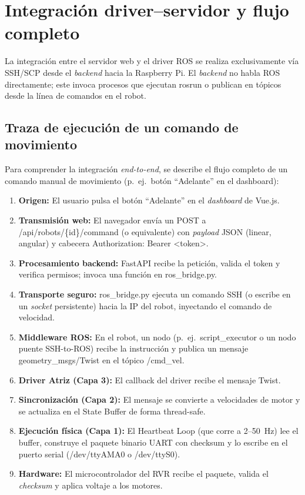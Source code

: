\documentclass[12pt]{article}
\numberwithin{figure}{section}
\numberwithin{table}{section}
\def\code#1{#1}%
\def\file#1{#1}%
\newcommand{\code}[1]{\textcolor{codeblue}{\url{#1}}}
\newcommand{\file}[1]{\textcolor{darkblue}{\url{#1}}}
\begin{document}
\section{Integración driver--servidor y flujo completo}
\justifying

La integración entre el servidor web y el driver ROS se realiza exclusivamente vía SSH/SCP desde el \textit{backend} hacia la Raspberry Pi. El \textit{backend} no habla ROS directamente; este invoca procesos que ejecutan \code{rosrun} o publican en tópicos desde la línea de comandos en el robot.


\subsection{Traza de ejecución de un comando de movimiento}

Para comprender la integración \textit{end-to-end}, se describe el flujo completo de un comando manual de movimiento (p.\ ej.\ botón ``Adelante'' en el dashboard):

\begin{enumerate}
    \item \textbf{Origen:} El usuario pulsa el botón ``Adelante'' en el \textit{dashboard} de Vue.js.
    \item \textbf{Transmisión web:} El navegador envía un \code{POST} a \code{/api/robots/\{id\}/command} (o equivalente) con \textit{payload} JSON (\code{linear}, \code{angular}) y cabecera \code{Authorization: Bearer <token>}.
    \item \textbf{Procesamiento backend:} FastAPI recibe la petición, valida el token y verifica permisos; invoca una función en \file{ros\_bridge.py}.
    \item \textbf{Transporte seguro:} \file{ros\_bridge.py} ejecuta un comando SSH (o escribe en un \textit{socket} persistente) hacia la IP del robot, inyectando el comando de velocidad.
    \item \textbf{Middleware ROS:} En el robot, un nodo (p.\ ej.\ \code{script\_executor} o un nodo puente SSH-to-ROS) recibe la instrucción y publica un mensaje \code{geometry\_msgs/Twist} en el tópico \code{/cmd\_vel}.
    \item \textbf{Driver Atriz (Capa 3):} El callback del driver recibe el mensaje Twist.
    \item \textbf{Sincronización (Capa 2):} El mensaje se convierte a velocidades de motor y se actualiza en el State Buffer de forma thread-safe.
    \item \textbf{Ejecución física (Capa 1):} El Heartbeat Loop (que corre a 2--50~Hz) lee el buffer, construye el paquete binario UART con checksum y lo escribe en el puerto serial (\code{/dev/ttyAMA0} o \code{/dev/ttyS0}).
    \item \textbf{Hardware:} El microcontrolador del RVR recibe el paquete, valida el \textit{checksum} y aplica voltaje a los motores.
\end{enumerate}
\end{document}
